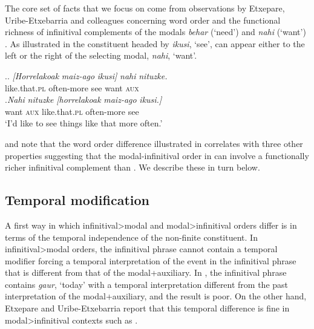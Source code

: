 \documentclass[output=paper]{langscibook}
\begin{document}
The core set of facts that we focus on come from observations by Etxepare, Uribe-Etxebarria and colleagues concerning word order and the functional richness of infinitival complements of the modals  \textit{behar} (`need') and \textit{nahi} (`want') \citep{etxepare-uribeetxebarria2009, etxepare-uribeetxebarria2012, balza2010}.  As illustrated in \Next the constituent headed by \textit{ikusi}, `see', can appear either to the left or the right of the selecting modal, \textit{nahi}, `want'.  

\ex.\protect\label{E-UE-2}\ag. \textit{[Horrelakoak} \textit{maiz-ago}   \textit{ikusi]} \textit{nahi}  \textit{nituzke.} \\
    like.that\textsc{.pl}    often-more see   want  \textsc{aux}     \\ \protect\label{E-UE-2a}
\bg.\textit{Nahi} \textit{nituzke} \textit{[horrelakoak} \textit{maiz-ago} \textit{ikusi.]} \\   
         want  \textsc{aux}      like.that\textsc{.pl}   often-more  see  \\ \protect\label{E-UE-2b}
          `I'd like to see things like that more often.'\\
\citep{etxepare-uribeetxebarria2009}


\cite{etxepare-uribeetxebarria2009, etxepare-uribeetxebarria2012} and \cite{balza2010} note that the word order difference illustrated in \Last correlates with three other properties suggesting that the modal-infinitival order in \Last[b] can involve a functionally richer infinitival complement than \Last[a].  We describe these in  turn below.

\subsection{Temporal modification}

A first way in which infinitival>modal and modal>infinitival orders differ is in terms of the temporal independence of the non-finite constituent.  In infinitival>modal orders, the infinitival phrase cannot contain a temporal modifier forcing a temporal interpretation of the event in the infinitival phrase that is different from that of the modal+auxiliary.  In \Next[a], the infinitival phrase contains \textit{gaur}, `today' with a temporal interpretation different from the past interpretation of the modal+auxiliary, and the result is poor.  On the other hand, Etxepare and Uribe-Etxebarria report that this temporal difference is fine in modal>infinitival contexts such as \Next[b].
\end{document}
